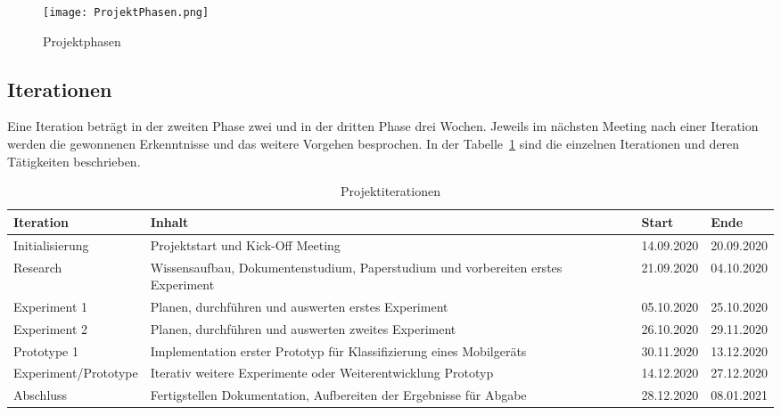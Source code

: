 \begin{figure}[h!]
	\centering
	\texttt{[image: ProjektPhasen.png]}
	\caption{Projektphasen
	\label{figure:Projektphasen}}
\end{figure}
	
\subsection*{Iterationen}
Eine Iteration beträgt in der zweiten Phase zwei
und in der dritten Phase drei Wochen. 
Jeweils im nächsten Meeting nach einer Iteration werden die gewonnenen 
Erkenntnisse und das weitere Vorgehen besprochen. 
In der Tabelle~\ref{table:Projektiterationen} sind die einzelnen 
Iterationen und deren Tätigkeiten beschrieben.

\begin{landscape}
	\begin{table}[H]
		\centering
		\begin{tabularx}{\linewidth}{l X l l}
			\toprule 
			\textbf{Iteration} & \textbf{Inhalt} & \textbf{Start} & \textbf{Ende} \\
			\midrule
			Initialisierung & Projektstart und Kick-Off Meeting & 14.09.2020 & 20.09.2020 \\
			\midrule
			Research & 
			Wissensaufbau, Dokumentenstudium, Paperstudium und vorbereiten erstes Experiment &
			21.09.2020 &
			04.10.2020 \\
			\midrule
			Experiment 1 & Planen, durchführen und auswerten erstes Experiment & 05.10.2020 & 25.10.2020 \\
			Experiment 2 & Planen, durchführen und auswerten zweites Experiment & 26.10.2020 & 29.11.2020 \\
			Prototype 1 & Implementation erster Prototyp für Klassifizierung eines Mobilgeräts & 30.11.2020 & 13.12.2020 \\
			Experiment/Prototype & Iterativ weitere Experimente oder Weiterentwicklung Prototyp & 14.12.2020 & 27.12.2020 \\
			\midrule
			Abschluss & Fertigstellen Dokumentation, Aufbereiten der Ergebnisse für Abgabe & 28.12.2020 & 08.01.2021 \\
			\bottomrule 
		\end{tabularx} 
		\caption{Projektiterationen
		\label{table:Projektiterationen}} 
	\end{table}
\end{landscape}

\clearpage

